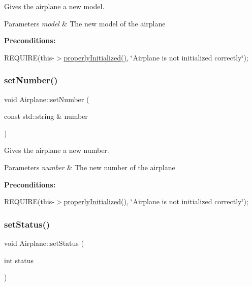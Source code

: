 Gives the airplane a new model. 


\begin{DoxyParams}{Parameters}
{\em model} & The new model of the airplane\\
\hline
\end{DoxyParams}
{\bfseries Preconditions\+:}
\begin{DoxyItemize}
\item R\+E\+Q\+U\+I\+RE(this-\/$>$\mbox{\hyperlink{class_airplane_a6f80df8f692cc8d67d292c1e9f26d59e}{properly\+Initialized()}}, \char`\"{}\+Airplane is not initialized correctly\char`\"{}); 
\end{DoxyItemize}\mbox{\label{class_airplane_af9bf0ea879bf7875b71f552ac9400da7}} 
\subsubsection{\texorpdfstring{set\+Number()}{setNumber()}}
{\footnotesize\ttfamily void Airplane\+::set\+Number (\begin{DoxyParamCaption}\item[{const std\+::string \&}]{number }\end{DoxyParamCaption})}



Gives the airplane a new number. 


\begin{DoxyParams}{Parameters}
{\em number} & The new number of the airplane\\
\hline
\end{DoxyParams}
{\bfseries Preconditions\+:}
\begin{DoxyItemize}
\item R\+E\+Q\+U\+I\+RE(this-\/$>$\mbox{\hyperlink{class_airplane_a6f80df8f692cc8d67d292c1e9f26d59e}{properly\+Initialized()}}, \char`\"{}\+Airplane is not initialized correctly\char`\"{}); 
\end{DoxyItemize}\mbox{\label{class_airplane_a29e3db63862db02af13212800b89d602}} 
\subsubsection{\texorpdfstring{set\+Status()}{setStatus()}}
{\footnotesize\ttfamily void Airplane\+::set\+Status (\begin{DoxyParamCaption}\item[{int}]{status }\end{DoxyParamCaption})}



